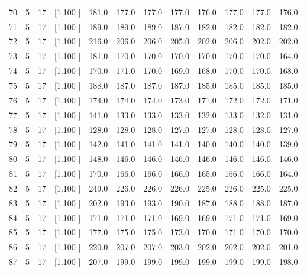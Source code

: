 \documentclass[12pt,a4paper]{article}
\begin{document}
\begin{center}
{\begin{tabular}{r r r r r r r r r r r r}
  70&  5& 17&[1.100     ]&   181.0&   177.0&   177.0&   177.0&   176.0&   177.0&   177.0&   176.0\\[-0.02in]
  71&  5& 17&[1.100     ]&   189.0&   189.0&   189.0&   187.0&   182.0&   182.0&   182.0&   182.0\\[-0.02in]
  72&  5& 17&[1.100     ]&   216.0&   206.0&   206.0&   205.0&   202.0&   206.0&   202.0&   202.0\\[-0.02in]
  73&  5& 17&[1.100     ]&   181.0&   170.0&   170.0&   170.0&   170.0&   170.0&   170.0&   164.0\\[-0.02in]
  74&  5& 17&[1.100     ]&   170.0&   171.0&   170.0&   169.0&   168.0&   170.0&   170.0&   168.0\\[-0.02in]
  75&  5& 17&[1.100     ]&   188.0&   187.0&   187.0&   187.0&   185.0&   185.0&   185.0&   185.0\\[-0.02in]
  76&  5& 17&[1.100     ]&   174.0&   174.0&   174.0&   173.0&   171.0&   172.0&   172.0&   171.0\\[-0.02in]
  77&  5& 17&[1.100     ]&   141.0&   133.0&   133.0&   133.0&   132.0&   133.0&   132.0&   131.0\\[-0.02in]
  78&  5& 17&[1.100     ]&   128.0&   128.0&   128.0&   127.0&   127.0&   128.0&   128.0&   127.0\\[-0.02in]
  79&  5& 17&[1.100     ]&   142.0&   141.0&   141.0&   141.0&   140.0&   140.0&   140.0&   139.0\\[-0.02in]
  80&  5& 17&[1.100     ]&   148.0&   146.0&   146.0&   146.0&   146.0&   146.0&   146.0&   146.0\\[-0.02in]
  81&  5& 17&[1.100     ]&   170.0&   166.0&   166.0&   166.0&   165.0&   166.0&   166.0&   164.0\\[-0.02in]
  82&  5& 17&[1.100     ]&   249.0&   226.0&   226.0&   226.0&   225.0&   226.0&   225.0&   225.0\\[-0.02in]
  83&  5& 17&[1.100     ]&   202.0&   193.0&   193.0&   190.0&   187.0&   188.0&   188.0&   187.0\\[-0.02in]
  84&  5& 17&[1.100     ]&   171.0&   171.0&   171.0&   169.0&   169.0&   171.0&   171.0&   169.0\\[-0.02in]
  85&  5& 17&[1.100     ]&   177.0&   175.0&   175.0&   173.0&   170.0&   171.0&   170.0&   170.0\\[-0.02in]
  86&  5& 17&[1.100     ]&   220.0&   207.0&   207.0&   203.0&   202.0&   202.0&   202.0&   201.0\\[-0.02in]
  87&  5& 17&[1.100     ]&   207.0&   199.0&   199.0&   199.0&   199.0&   199.0&   199.0&   198.0\\[-0.02in]

\end{tabular}}
\end{center}
\end{document}

